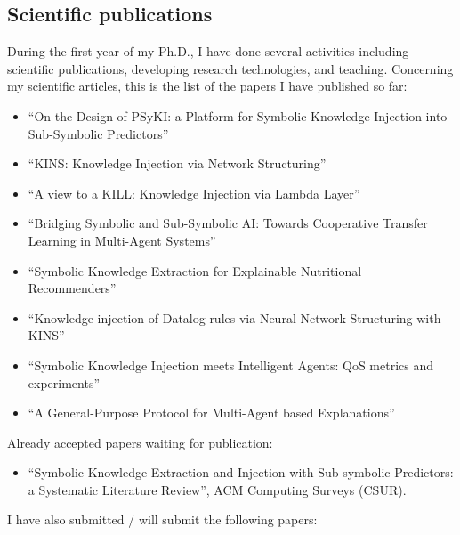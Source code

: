 \documentclass[]{scrartcl}
\begin{document}
    \subsection{Scientific publications}
    \label{sec:done:publications}
    During the first year of my Ph.D., I have done several activities including scientific publications, developing research technologies, and teaching.
    Concerning my scientific articles, this is the list of the papers I have published so far:
    \begin{itemize}
        \item ``On the Design of PSyKI: a Platform for Symbolic Knowledge Injection into Sub-Symbolic Predictors''~\cite{psyki-extraamas2022}
        \item ``KINS: Knowledge Injection via Network Structuring''~\cite{kins-cilc2022}
        \item ``A view to a KILL: Knowledge Injection via Lambda Layer''~\cite{kill-woa2022}
        \item ``Bridging Symbolic and Sub-Symbolic AI: Towards Cooperative Transfer Learning in Multi-Agent Systems''~\cite{ctl-aixia2022}
        \item ``Symbolic Knowledge Extraction for Explainable Nutritional Recommenders''~\cite{skerecommender-cmbp235}
        \item ``Knowledge injection of Datalog rules via Neural Network Structuring with KINS''~\cite{kins-jlc2023}
        \item ``Symbolic Knowledge Injection meets Intelligent Agents: QoS metrics and experiments''~\cite{skiqos-jaamas37}
        \item ``A General-Purpose Protocol for Multi-Agent based Explanations''~\cite{explanationprotocol-extraamas2023}
    \end{itemize}
    Already accepted papers waiting for publication:
    \begin{itemize}
        \item ``Symbolic Knowledge Extraction and Injection with Sub-symbolic Predictors: a Systematic Literature Review'', ACM Computing Surveys (CSUR).
    \end{itemize}
    I have also submitted / will submit the following papers:
\end{document}

